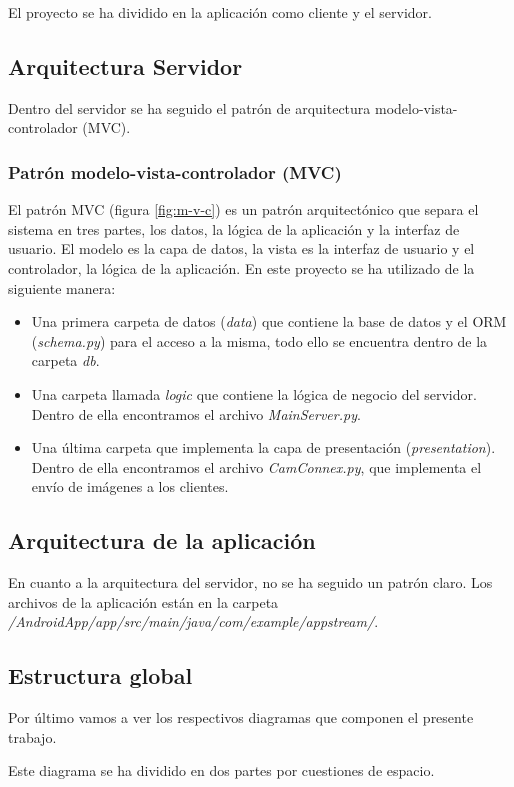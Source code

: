 El proyecto se ha dividido en la aplicación como cliente y el servidor.

\subsection{Arquitectura Servidor}

Dentro del servidor se ha seguido el patrón de arquitectura modelo-vista-controlador (MVC).

\subsubsection{Patrón modelo-vista-controlador (MVC)}

El patrón MVC (figura \ref{fig:m-v-c}) es un patrón arquitectónico que separa el sistema en tres partes, los datos, la lógica de la aplicación y la interfaz de usuario. El modelo es la capa de datos, la vista es la interfaz de usuario y el controlador, la lógica de la aplicación.
En este proyecto se ha utilizado de la siguiente manera:
\begin{itemize}
\item
	Una primera carpeta de datos (\textit{data}) que contiene la base de datos y el ORM (\textit{schema.py}) para el acceso a la misma, todo ello se encuentra dentro de la carpeta \textit{db}.
\item
	Una carpeta llamada \textit{logic} que contiene la lógica de negocio del servidor. 
	Dentro de ella encontramos el archivo \textit{MainServer.py}. 
\item
	Una última carpeta que implementa la capa de presentación (\textit{presentation}).
	Dentro de ella encontramos el archivo \textit{CamConnex.py}, que implementa el envío de imágenes a los clientes.
\end{itemize}

\subsection{Arquitectura de la aplicación}

En cuanto a la arquitectura del servidor, no se ha seguido un patrón claro.
Los archivos de la aplicación están en la carpeta \textit{/AndroidApp/app/src/main/java/com/example/appstream/}.

\subsection{Estructura global}

Por último vamos a ver los respectivos diagramas que componen el presente trabajo.


Este diagrama se ha dividido en dos partes por cuestiones de espacio.


\begin{landscape}
\end{landscape}
